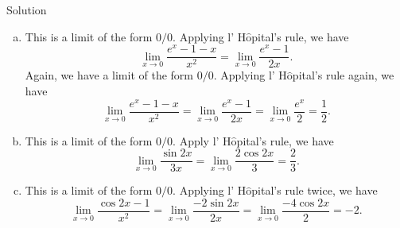 \begin{solution}{Solution}
\begin{enumerate}[(a)]
\item
This is a limit of the form $0/0$. Applying l' H$\hat{\text{o}}$pital's rule, we have
\[\lim_{x\to 0}\frac{e^x-1-x}{x^2}=\lim_{x\to 0}\frac{e^x-1}{2x}.\]
Again, we have a limit of the form $0/0$. Applying l' H$\hat{\text{o}}$pital's rule again, we have
\[\lim_{x\to 0}\frac{e^x-1-x}{x^2}=\lim_{x\to 0}\frac{e^x-1}{2x}=\lim_{x\to 0}\frac{e^x}{2}=\frac{1}{2}.\]
\item This is a limit of the form $0/0$.  Apply l' H$\hat{\text{o}}$pital's rule, we have
\[\lim_{x\to 0}\frac{\sin 2x}{3x}=\lim_{x\to 0}\frac{2\cos 2x}{3}=\frac{2}{3}.\]
\item This is a limit of the form $0/0$. Applying l' H$\hat{\text{o}}$pital's rule twice, we have
\[\lim_{x\to 0}\frac{\cos 2x-1}{x^2}=\lim_{x\to 0}\frac{-2\sin 2x}{2x}=\lim_{x\to 0}\frac{-4\cos 2x}{2}=-2.\]
\end{enumerate}
\end{solution}
 
